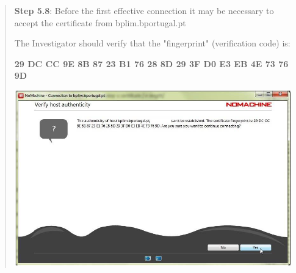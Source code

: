 \documentclass[]{book}
\begin{document}
\begin{quote}
\textbf{Step 5.8}: Before the first effective connection it may be
necessary to accept the certificate from bplim.bportugal.pt

The Investigator should verify that the "fingerprint" (verification
code) is:

\textbf{29 DC CC 9E 8B 87 23 B1 76 28 8D 29 3F D0 E3 EB 4E 73 76 9D}

\includegraphics[width=4.72441in,height=2.98511in]{./media/image33.png}
\end{quote}

\textbf{\\
}
\end{document}
